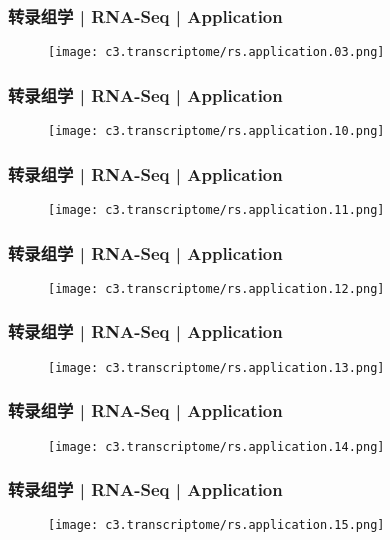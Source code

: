 \begin{frame}
  \frametitle{转录组学 | RNA-Seq | Application}
  \begin{figure}
    \centering
    \texttt{[image: c3.transcriptome/rs.application.03.png]}
  \end{figure}
\end{frame}

\begin{frame}
  \frametitle{转录组学 | RNA-Seq | Application}
  \begin{figure}
    \centering
    \texttt{[image: c3.transcriptome/rs.application.10.png]}
  \end{figure}
\end{frame}

\begin{frame}
  \frametitle{转录组学 | RNA-Seq | Application}
  \begin{figure}
    \centering
    \texttt{[image: c3.transcriptome/rs.application.11.png]}
  \end{figure}
\end{frame}

\begin{frame}
  \frametitle{转录组学 | RNA-Seq | Application}
  \begin{figure}
    \centering
    \texttt{[image: c3.transcriptome/rs.application.12.png]}
  \end{figure}
\end{frame}

\begin{frame}
  \frametitle{转录组学 | RNA-Seq | Application}
  \begin{figure}
    \centering
    \texttt{[image: c3.transcriptome/rs.application.13.png]}
  \end{figure}
\end{frame}

\begin{frame}
  \frametitle{转录组学 | RNA-Seq | Application}
  \begin{figure}
    \centering
    \texttt{[image: c3.transcriptome/rs.application.14.png]}
  \end{figure}
\end{frame}

\begin{frame}
  \frametitle{转录组学 | RNA-Seq | Application}
  \begin{figure}
    \centering
    \texttt{[image: c3.transcriptome/rs.application.15.png]}
  \end{figure}
\end{frame}


